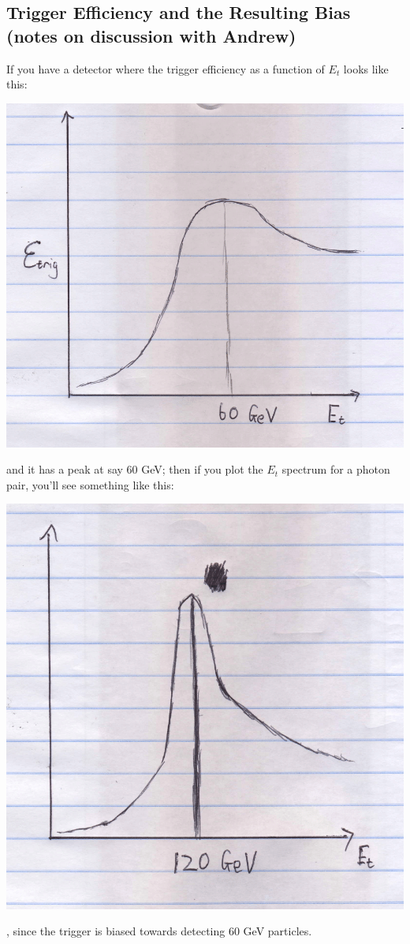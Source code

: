\documentclass{article}
\begin{document}
\subsection{Trigger Efficiency and the Resulting Bias (notes on discussion with Andrew)}
If you have a detector where the trigger efficiency as a function of $E_{t}$ looks like this:\\
\centerline{\includegraphics[scale=0.2]{trigger_eff.png}}
and it has a peak at say 60 GeV; then if you plot the $E_{t}$ spectrum for a photon pair, you'll see something like this:\\
\centerline{\includegraphics[scale=0.25]{trigg_bias.png}}
, since the trigger is biased towards detecting 60 GeV particles.
\end{document}
